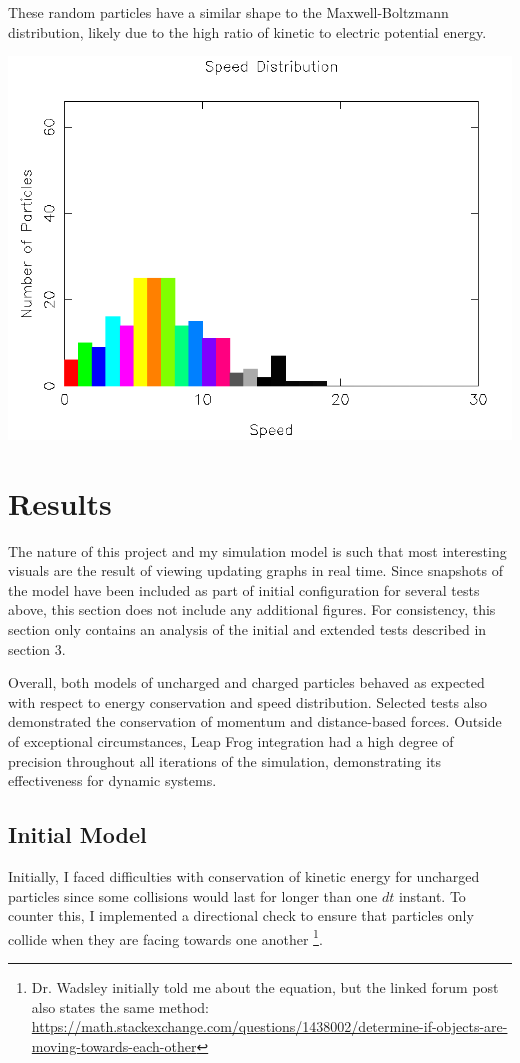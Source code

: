 \documentclass{article}
\begin{document}
These random particles have a similar shape to the Maxwell-Boltzmann distribution,
likely due to the high ratio of kinetic to electric potential energy.
\\
\begin{center}
    \includegraphics[scale=0.5]{charged_random_dist}
\end{center}


\section{Results}
The nature of this project and my simulation model is such that most interesting visuals
are the result of viewing updating graphs in real time.
Since snapshots of the model have been included as part of initial configuration for several tests above,
this section does not include any additional figures.
For consistency, this section only contains an analysis of the initial and extended tests described in section 3.

Overall, both models of uncharged and charged particles behaved as expected
with respect to energy conservation and speed distribution.
Selected tests also demonstrated the conservation of momentum and distance-based forces.
Outside of exceptional circumstances, Leap Frog integration had a high degree of precision throughout all iterations of the simulation,
demonstrating its effectiveness for dynamic systems.

\subsection{Initial Model}
Initially, I faced difficulties with conservation of kinetic energy for uncharged particles
since some collisions would last for longer than one $dt$ instant.
To counter this, I implemented a directional check to ensure that particles only
collide when they are facing towards one another
\footnote{Dr. Wadsley initially told me about the equation, but the linked forum post also states the same method:
\url{https://math.stackexchange.com/questions/1438002/determine-if-objects-are-moving-towards-each-other}}.
\end{document}
